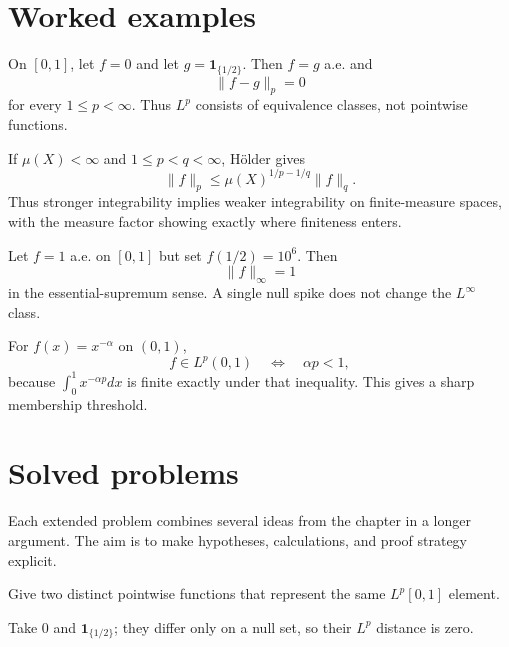 \section{Worked examples}

\begin{example}\label{ex:iii06-worked-01}
On \([0,1]\), let \(f=0\) and let \(g=\mathbf1_{\{1/2\}}\). Then
\(f=g\) a.e. and
\[
\|f-g\|_p=0
\]
for every \(1\le p<\infty\). Thus \(L^p\) consists of equivalence classes, not
pointwise functions.
\end{example}

\begin{example}\label{ex:iii06-worked-02}
If \(\mu(X)<\infty\) and \(1\le p<q<\infty\), Hölder gives
\[
\|f\|_p\le \mu(X)^{1/p-1/q}\|f\|_q.
\]
Thus stronger integrability implies weaker integrability on finite-measure
spaces, with the measure factor showing exactly where finiteness enters.
\end{example}

\begin{example}\label{ex:iii06-worked-03}
Let \(f=1\) a.e. on \([0,1]\) but set \(f(1/2)=10^6\). Then
\[
\|f\|_\infty=1
\]
in the essential-supremum sense. A single null spike does not change the
\(L^\infty\) class.
\end{example}

\begin{example}\label{ex:iii06-worked-04}
For \(f(x)=x^{-\alpha}\) on \((0,1)\),
\[
f\in L^p(0,1)\quad\Longleftrightarrow\quad \alpha p<1,
\]
because \(\int_0^1x^{-\alpha p}dx\) is finite exactly under that inequality.
This gives a sharp membership threshold.
\end{example}

\section{Solved problems}
Each extended problem combines several ideas from the chapter in a longer argument. The aim is to make hypotheses, calculations, and proof strategy explicit.

\begin{problem}\label{prob:iii06-problem-01}
Give two distinct pointwise functions that represent the same \(L^p[0,1]\) element.
\end{problem}
\begin{solution}
Take \(0\) and \(\mathbf1_{\{1/2\}}\); they differ only on a null set, so
their \(L^p\) distance is zero.
\end{solution}

